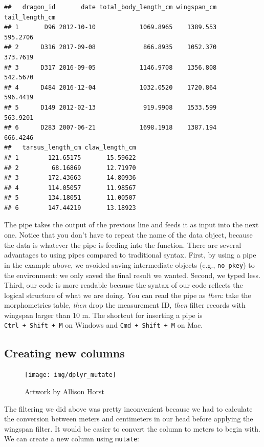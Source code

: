 \documentclass[
]{book}
\begin{document}
\begin{verbatim}
##   dragon_id       date total_body_length_cm wingspan_cm tail_length_cm
## 1       D96 2012-10-10            1069.8965    1389.553       595.2706
## 2      D316 2017-09-08             866.8935    1052.370       373.7619
## 3      D317 2016-09-05            1146.9708    1356.808       542.5670
## 4      D484 2016-12-04            1032.0520    1720.864       596.4419
## 5      D149 2012-02-13             919.9908    1533.599       563.9201
## 6      D283 2007-06-21            1698.1918    1387.194       666.4246
##   tarsus_length_cm claw_length_cm
## 1        121.65175       15.59622
## 2         68.16869       12.71970
## 3        172.43663       14.80936
## 4        114.05057       11.98567
## 5        134.18051       11.00507
## 6        147.44219       13.18923
\end{verbatim}

The pipe takes the output of the previous line and feeds it as input into the
next one. Notice that you don't have to repeat the name of the data object,
because the data is whatever the pipe is feeding into the function. There are
several advantages to using pipes compared to traditional syntax. First, by
using a pipe in the example above, we avoided saving intermediate objects (e.g.,
\texttt{no\_pkey}) to the environment: we only saved the final result we wanted. Second,
we typed less. Third, our code is more readable because the syntax of our code
reflects the logical structure of what we are doing. You can read the pipe as
\emph{then}: take the morphometrics table, \emph{then} drop the measurement ID, \emph{then}
filter records with wingspan larger than 10 m. The shortcut for inserting a pipe
is \texttt{Ctrl\ +\ Shift\ +\ M} on Windows and \texttt{Cmd\ +\ Shift\ +\ M} on Mac.

\hypertarget{creating-new-columns}{%
\subsection{Creating new columns}\label{creating-new-columns}}

\begin{figure}

{\centering \texttt{[image: img/dplyr\_mutate]} 

}

\caption{Artwork by Allison Horst}\label{fig:tidyfig2}
\end{figure}

The filtering we did above was pretty inconvenient because we had to calculate
the conversion between meters and centimeters in our head before applying the
wingspan filter. It would be easier to convert the column to meters to begin
with. We can create a new column using \texttt{mutate}:
\end{document}

